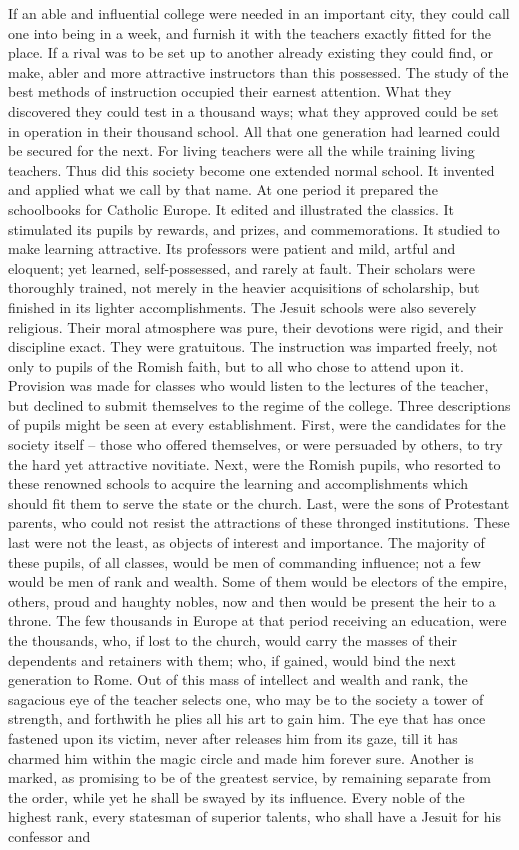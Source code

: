 \documentclass[]{book}
\begin{document}
If an able and influential college were needed in an important city, they could call one into being in a week, and furnish it with the teachers exactly fitted for the place. If a rival was to be set up to another already existing they could find, or make, abler and more attractive instructors than this possessed. The study of the best methods of instruction occupied their earnest attention. What they discovered they could test in a thousand ways; what they approved could be set in operation in their thousand school. All that one generation had learned could be secured for the next. For living teachers were all the while training living teachers. Thus did this society become one extended normal school. It invented and applied what we call by that name. At one period it prepared the schoolbooks for Catholic Europe. It edited and illustrated the classics. It stimulated its pupils by rewards, and prizes, and commemorations. It studied to make learning attractive. Its professors were patient and mild, artful and eloquent; yet learned, self-possessed, and rarely at fault. Their scholars were thoroughly trained, not merely in the heavier acquisitions of scholarship, but finished in its lighter accomplishments. The Jesuit schools were also severely religious. Their moral atmosphere was pure, their devotions were rigid, and their discipline exact. They were gratuitous. The instruction was imparted freely, not only to pupils of the Romish faith, but to all who chose to attend upon it. Provision was made for classes who would listen to the lectures of the teacher, but declined to submit themselves to the regime of the college. Three descriptions of pupils might be seen at every establishment. First, were the candidates for the society itself -- those who offered themselves, or were persuaded by others, to try the hard yet attractive novitiate. Next, were the Romish pupils, who resorted to these renowned schools to acquire the learning and accomplishments which should fit them to serve the state or the church. Last, were the sons of Protestant parents, who could not resist the attractions of these thronged institutions. These last were not the least, as objects of interest and importance. The majority of these pupils, of all classes, would be men of commanding influence; not a few would be men of rank and wealth. Some of them would be electors of the empire, others, proud and haughty nobles, now and then would be present the heir to a throne. The few thousands in Europe at that period receiving an education, were the thousands, who, if lost to the church, would carry the masses of their dependents and retainers with them; who, if gained, would bind the next generation to Rome. Out of this mass of intellect and wealth and rank, the sagacious eye of the teacher selects one, who may be to the society a tower of strength, and forthwith he plies all his art to gain him. The eye that has once fastened upon its victim, never after releases him from its gaze, till it has charmed him within the magic circle and made him forever sure. Another is marked, as promising to be of the greatest service, by remaining separate from the order, while yet he shall be swayed by its influence. Every noble of the highest rank, every statesman of superior talents, who shall have a Jesuit for his confessor and 
\end{document}
